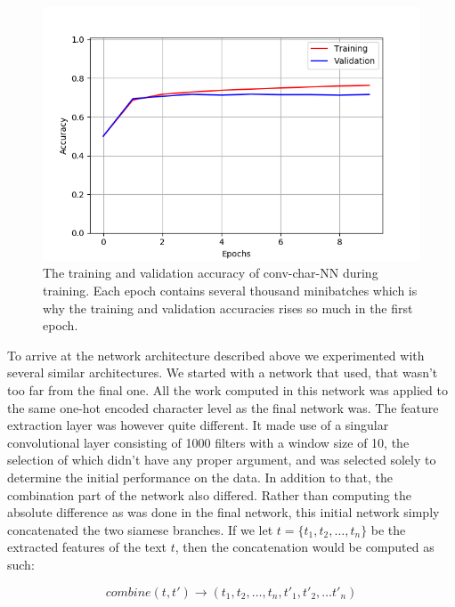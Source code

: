\begin{figure}
    \centering
    \includegraphics[width=\textwidth]{./pictures/experiments/conv_char_nn/training_accuracy.png}
    \caption{The training and validation accuracy of \gls{conv-char-NN} during
        training. Each epoch contains several thousand minibatches which is why
        the training and validation accuracies rises so much in the first
        epoch.}
    \label{fig:conv-char-NN-accuracies}
\end{figure}

To arrive at the network architecture described above we experimented with
several similar architectures. We started with a network that used,
that wasn't too far from the final one.
All the work computed in this network was applied to the same one-hot encoded
character level as the final network was. The feature extraction layer
was however quite different. It made use of a singular convolutional layer
consisting of 1000 filters with a window size of 10, the selection
of which didn't have any proper argument, and was selected solely to
determine the initial performance on the data.
In addition to that, the combination part of the network also differed.
Rather than computing the absolute difference as was done in the final network,
this initial network simply concatenated the two siamese branches.
If we let $t = \{t_1, t_2, \dots, t_n\}$ be the extracted features of the 
text $t$, then the concatenation would be computed as such:

\begin{equation}
combine(t, t') \rightarrow (t_1, t_2, \dots, t_n, t'_1, t'_2, \dots t'_n)
\end{equation}

